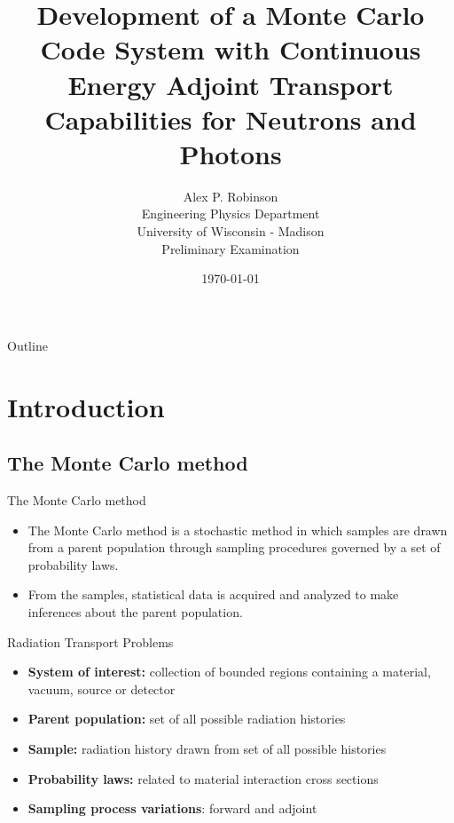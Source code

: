 \documentclass{beamer}
\author{Alex P. Robinson
    \\ Engineering Physics Department
    \\ University of Wisconsin - Madison
    \\ Preliminary Examination
}
\date{\today}
\title{Development of a Monte Carlo Code System with Continuous Energy Adjoint Transport Capabilities for Neutrons and Photons}
\begin{document}
\maketitle
\begin{frame}{Outline}

  \tableofcontents

\end{frame}

\section{Introduction}
\subsection{The Monte Carlo method}
\begin{frame}{The Monte Carlo method}

  \begin{itemize}
    \item The Monte Carlo method is a stochastic method in which samples are
      drawn from a parent population through sampling procedures governed by
      a set of probability laws.
    \item From the samples, statistical data is acquired and analyzed to make
      inferences about the parent population.
  \end{itemize}
  
  \medskip
  \medskip
  
  \begin{beamerboxesrounded}{Radiation Transport Problems}
    \begin{itemize}
      \item \textbf{System of interest:} collection of bounded regions 
        containing a material, vacuum, source or detector
      \item \textbf{Parent population:} set of all possible radiation histories
      \item \textbf{Sample:} radiation history drawn from set of all possible 
        histories
      \item \textbf{Probability laws:} related to material interaction cross 
        sections
      \item \textbf{Sampling process variations}: forward and adjoint
    \end{itemize}
  \end{beamerboxesrounded}
    
\end{frame}
\end{document}
